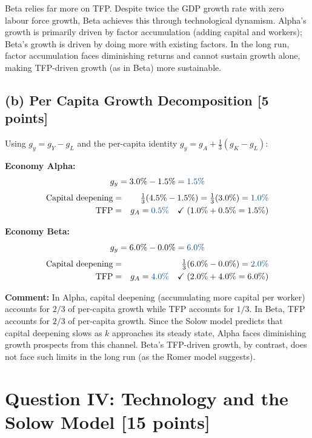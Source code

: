 \documentclass[letterpaper,12pt]{article}
\begin{document}
\noindent Beta relies far more on TFP. Despite twice the GDP growth rate with zero labour force growth, Beta achieves this through technological dynamism. Alpha's growth is primarily driven by factor accumulation (adding capital and workers); Beta's growth is driven by doing more with existing factors. In the long run, factor accumulation faces diminishing returns and cannot sustain growth alone, making TFP-driven growth (as in Beta) more sustainable.

\subsection*{(b) Per Capita Growth Decomposition [5 points]}

Using $g_y = g_Y - g_L$ and the per-capita identity $g_y = g_A + \frac{1}{3}(g_K - g_L)$:

\textbf{Economy Alpha:}
\[
g_y = 3.0\% - 1.5\% = \textcolor{sol}{1.5\%}
\]
\begin{eqnarray*}
\text{Capital deepening} &=& \tfrac{1}{3}(4.5\% - 1.5\%) = \tfrac{1}{3}(3.0\%) = \textcolor{sol}{1.0\%} \\
\text{TFP}               &=& g_A = \textcolor{sol}{0.5\%} \quad \checkmark \; (1.0\% + 0.5\% = 1.5\%)
\end{eqnarray*}

\textbf{Economy Beta:}
\[
g_y = 6.0\% - 0.0\% = \textcolor{sol}{6.0\%}
\]
\begin{eqnarray*}
\text{Capital deepening} &=& \tfrac{1}{3}(6.0\% - 0.0\%) = \textcolor{sol}{2.0\%} \\
\text{TFP}               &=& g_A = \textcolor{sol}{4.0\%} \quad \checkmark \; (2.0\% + 4.0\% = 6.0\%)
\end{eqnarray*}

\noindent \textbf{Comment:} In Alpha, capital deepening (accumulating more capital per worker) accounts for $2/3$ of per-capita growth while TFP accounts for $1/3$. In Beta, TFP accounts for $2/3$ of per-capita growth. Since the Solow model predicts that capital deepening slows as $k$ approaches its steady state, Alpha faces diminishing growth prospects from this channel. Beta's TFP-driven growth, by contrast, does not face such limits in the long run (as the Romer model suggests).


\section*{Question IV: Technology and the Solow Model [15 points]}
\end{document}
